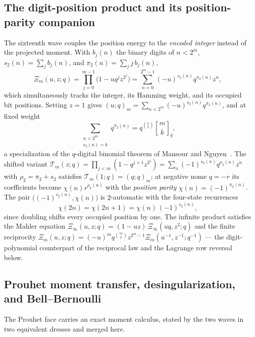 \documentclass[11pt,oneside]{article}
\numberwithin{equation}{section}
\theoremstyle{definition}
\theoremstyle{remark}
\newcommand{\wt}{s_2}
\newcommand{\qbinom}[3]{\genfrac{[}{]}{0pt}{}{#1}{#2}_{#3}}
\begin{document}
\subsection{The digit-position product and its position-parity companion}

The sixteenth wave couples the position energy to the \emph{encoded integer}
instead of the projected moment.  With $b_j(n)$ the binary digits of
$n<2^m$, $\wt(n)=\sum_jb_j(n)$, and $\pi_2(n)=\sum_jj\,b_j(n)$,
\begin{equation}\label{p7:eq:digit-master}
 \Xi_m(u,z;q)=\prod_{j=0}^{m-1}\bigl(1-uq^jz^{2^j}\bigr)
 =\sum_{n=0}^{2^m-1}(-u)^{\wt(n)}q^{\pi_2(n)}z^n,
\end{equation}
which simultaneously tracks the integer, its Hamming weight, and its occupied
bit positions.  Setting $z=1$ gives
$(u;q)_m=\sum_{n<2^m}(-u)^{\wt(n)}q^{\pi_2(n)}$, and at fixed weight
\begin{equation}\label{p7:eq:fixed-weight}
 \sum_{\substack{n<2^m\\ \wt(n)=k}}q^{\pi_2(n)}
 =q^{\binom k2}\qbinom mkq,
\end{equation}
a specialization of the $q$-digital binomial theorem of Mansour and
Nguyen~\cite{p7:mansour-nguyen}.  The shifted variant
$\mathcal T_m(z;q)=\prod_{j<m}(1-q^{j+1}z^{2^j})
=\sum_n(-1)^{\wt(n)}q^{\rho_2(n)}z^n$ with
$\rho_2=\pi_2+\wt$ satisfies
$\mathcal T_m(1;q)=(q;q)_m$; at negative nome $q=-r$ its coefficients become
$\chi(n)r^{\rho_2(n)}$ with the \emph{position parity}
$\chi(n)=(-1)^{\pi_2(n)}$.  The pair
$\bigl((-1)^{\wt(n)},\chi(n)\bigr)$ is $2$-automatic with the four-state
recurrences
\begin{equation}\label{p7:eq:four-state}
 \chi(2n)=\chi(2n+1)=\chi(n)\,(-1)^{\wt(n)},
\end{equation}
since doubling shifts every occupied position by one.  The infinite product
satisfies the Mahler equation
$\Xi_\infty(u,z;q)=(1-uz)\,\Xi_\infty(uq,z^2;q)$ and the finite reciprocity
$\Xi_m(u,z;q)=(-u)^mq^{\binom m2}z^{2^m-1}\Xi_m(u^{-1},z^{-1};q^{-1})$ ---
the digit-polynomial counterpart of the reciprocal law and the Lagrange row
reversal below.

\subsection{Prouhet moment transfer, desingularization, and Bell--Bernoulli}

The Prouhet face carries an exact moment calculus, stated by the two waves in
two equivalent dresses and merged here.
\end{document}
